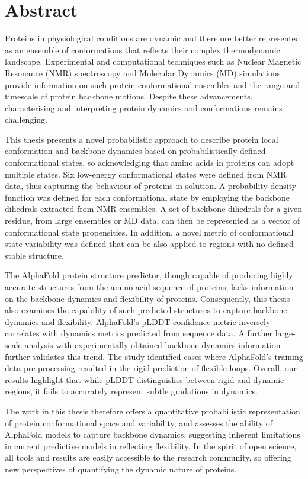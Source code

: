\chapter*{Abstract}

Proteins in physiological conditions are dynamic and therefore better represented as an ensemble of conformations that reflects their complex thermodynamic landscape. Experimental and computational techniques such as Nuclear Magnetic Resonance (NMR) spectroscopy and Molecular Dynamics (MD) simulations provide information on such protein conformational ensembles and the range and timescale of protein backbone motions. Despite these advancements, characterising and interpreting protein dynamics and conformations remains challenging.

This thesis presents a novel probabilistic approach to describe protein local conformation and backbone dynamics based on probabilistically-defined conformational states, so acknowledging that amino acids in proteins can adopt multiple states. Six low-energy conformational states were defined from NMR data, thus capturing the behaviour of proteins in solution. A probability density function was defined for each conformational state by employing the backbone dihedrals extracted from NMR ensembles. A set of backbone dihedrals for a given residue, from large ensembles or MD data, can then be represented as a vector of conformational state propensities.  In addition, a novel metric of conformational state variability was defined that can be also applied to regions with no defined stable structure.

The AlphaFold protein structure predictor, though capable of producing highly accurate structures from the amino acid sequence of proteins, lacks information on the backbone dynamics and flexibility of proteins. Consequently, this thesis also examines the capability of such predicted structures to capture backbone dynamics and flexibility. AlphaFold's pLDDT confidence metric inversely correlates with dynamics metrics predicted from sequence data. A further large-scale analysis with experimentally obtained backbone dynamics information further validates this trend. The study identified cases where AlphaFold’s training data pre-processing resulted in the rigid prediction of flexible loops. Overall, our results highlight that while pLDDT distinguishes between rigid and dynamic regions, it fails to accurately represent subtle gradations in dynamics.
 
The work in this thesis therefore offers a quantitative probabilistic representation of protein conformational space and variability, and  assesses the ability of AlphaFold models to capture backbone dynamics, suggesting inherent limitations in current predictive models in reflecting flexibility. In the spirit of open science, all tools and results are easily accessible to the research community, so offering new perspectives of quantifying the dynamic nature of proteins.
